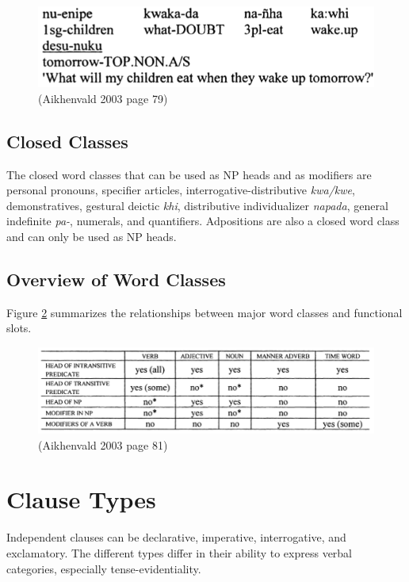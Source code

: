 \documentclass{article}
\begin{document}
\begin{figure}[h!]
\centering
\includegraphics[scale = 0.38]{eattomorrow.png}
	\caption{(Aikhenvald 2003 page 79)}
	\label{eattomorrow}
\end{figure}

\subsection{Closed Classes} \label{Closed Classes}
The closed word classes that can be used as NP heads and as modifiers are personal pronouns, specifier articles, interrogative-distributive \textit{kwa/kwe}, demonstratives, gestural deictic \textit{khi}, distributive individualizer \textit{napada}, general indefinite \textit{pa-}, numerals, and quantifiers. Adpositions are also a closed word class and can only be used as NP heads.

\subsection{Overview of Word Classes}
Figure \ref*{wordclasstable} summarizes the relationships between major word classes and functional slots.

\begin{figure}[h!]
\centering
\includegraphics[scale = 0.45]{wordclasstable.png}
	\caption{(Aikhenvald 2003 page 81)}
	\label{wordclasstable}
\end{figure}


\section{Clause Types}
Independent clauses can be declarative, imperative, interrogative, and exclamatory. The different types differ in their ability to express verbal categories, especially tense-evidentiality.
\end{document}
